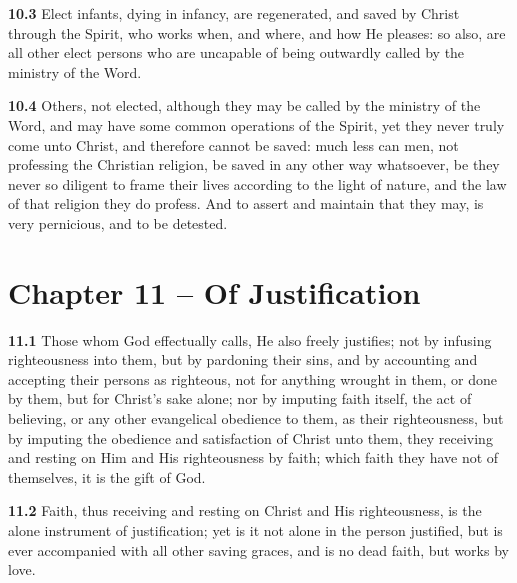\par\textbf{10.3} Elect infants, dying in infancy, are regenerated, and saved by Christ through the Spirit, who works when, and where, and how He pleases: so also, are all other elect persons who are uncapable of being outwardly called by the ministry of the Word.   

\par\textbf{10.4} Others, not elected, although they may be called by the ministry of the Word, and may have some common operations of the Spirit, yet they never truly come unto Christ, and therefore cannot be saved: much less can men, not professing the Christian religion, be saved in any other way whatsoever, be they never so diligent to frame their lives according to the light of nature, and the law of that religion they do profess. And to assert and maintain that they may, is very pernicious, and to be detested.  

\section{Chapter 11 -- Of Justification}

\par\textbf{11.1} Those whom God effectually calls, He also freely justifies; not by infusing righteousness into them, but by pardoning their sins, and by accounting and accepting their persons as righteous, not for anything wrought in them, or done by them, but for Christ's sake alone; nor by imputing faith itself, the act of believing, or any other evangelical obedience to them, as their righteousness, but by imputing the obedience and satisfaction of Christ unto them, they receiving and resting on Him and His righteousness by faith; which faith they have not of themselves, it is the gift of God.   

\par\textbf{11.2} Faith, thus receiving and resting on Christ and His righteousness, is the alone instrument of justification; yet is it not alone in the person justified, but is ever accompanied with all other saving graces, and is no dead faith, but works by love.   

